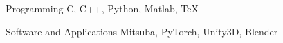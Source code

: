 
\begin{cvskills}

	\cvskill
	{Programming}
    {C, C++, Python, Matlab, \TeX}

	\cvskill
	{Software and Applications}
    {Mitsuba, PyTorch, Unity3D, Blender}


\end{cvskills}
